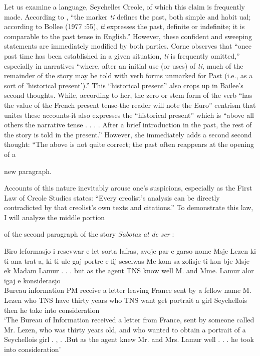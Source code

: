 Let us examine a language, Seychelles Creole, of which this claim is frequently made. According to \citet[102]{Corne1977}, ``the marker \textit{ti} defines the past, both simple and habit ual{\textquotedbl}; according to Bollee (1977 :55), \textit{{\textquotedbl}ti} expresses the past, definite or indefinite; it is comparable to the past tense in English.'' However, these confident and sweeping statements are immediately modified by both parties. Corne observes that ``once past time has been established in a given situation, \textit{ti} is frequently omitted,'' especially in narratives ``where, after an initial use (or uses) of \textit{ti,} much of the remainder of the story may be told with verb forms unmarked for Past (i.e., as a sort of 'historical present').'' This ``historical present'' also crops up in Bailee's second thoughts. While, according to her, the zero or stem form of the verb ``has the value of the French present tense{\textquotedbl}{}-the reader will note the Euro'' centrism that unites these accounts{}-it also expresses the ``historical present'' which is ``above all others the narrative tense . . . . After a brief introduction in the past, the rest of the story is told in the pres\-ent.'' However, she immediately adds a second second thought: ``The above is not quite correct; the past often reappears at the opening of a

new paragraph.{\textquotedbl}

Accounts of this nature inevitably arouse one's suspicions, especially as the First Law of Creole Studies states: ``Every creolist's analysis can be directly contradicted by that creolist's own texts and citations.'' To demonstrate this law, I will analyze the middle portion

of the second paragraph of the story \textit{Sabotaz} \textit{at} \textit{de} \textit{ser} \citep[166]{Bollee1977}:


\ea\label{ex:2:94}
 {Biro} {le}{formasjo} {i} resevwar {e} {let} {sorta} {lafras,}
{avoje} {par} {e} {garso} {nome} {M}{sje} {Lezen} {ki} ti ana {trat-a,}
{ki} ti ule {gaj} {portre} {e} {fij} {seselwas}  
{Me} {kom} {sa} {zofisje} ti kon {b}{je} {Msje} {ek} {M}{adam} {Lamur} {.} . . but as the agent TNS know well M. and Mme. Lamur {alor} igaj {e} {konsiderasjo} \\
Bureau information PM receive a letter leaving France sent by a fellow name M. Lezen who TNS have thirty years who TNS want get portrait a girl Seychellois then he take into consideration\\
\glt `The Bureau of Information received a letter from France, sent by someone called Mr. Lezen, who was thirty years old, and who wanted to obtain a portrait of a Seychellois girl . , . .But as the agent knew Mr. and Mrs. Lamur well . . . he took into consideration'
\z





